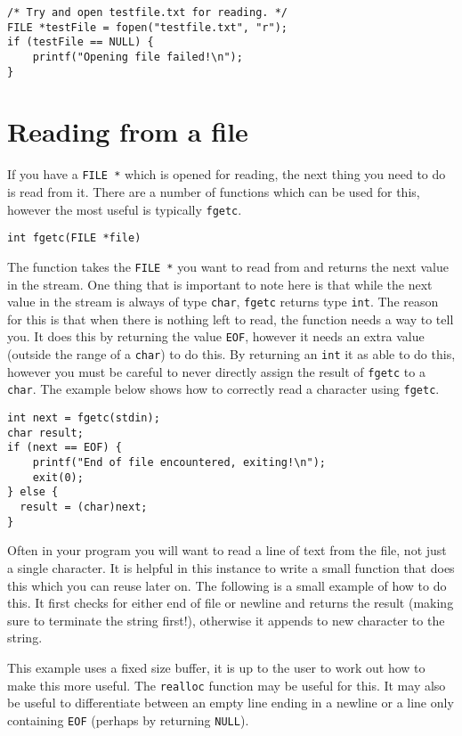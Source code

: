\begin{lstlisting}
/* Try and open testfile.txt for reading. */ 
FILE *testFile = fopen("testfile.txt", "r");
if (testFile == NULL) {
    printf("Opening file failed!\n");
}
\end{lstlisting}

\section{Reading from a file}

If you have a \texttt{FILE *} which is opened for reading, the next thing you need to do is read from it.
There are a number of functions which can be used for this, however the most useful is typically \texttt{fgetc}.

\begin{lstlisting}[numbers=none,frame=none]
int fgetc(FILE *file)
\end{lstlisting}

The function takes the \texttt{FILE *} you want to read from and returns the next value in the stream.
One thing that is important to note here is that while the next value in the stream is always of type \texttt{char}, \texttt{fgetc} returns type \texttt{int}. 
The reason for this is that when there is nothing left to read, the function needs a way to tell you.
It does this by returning the value \texttt{EOF}, however it needs an extra value (outside the range of a \texttt{char}) to do this.
By returning an \texttt{int} it as able to do this, however you must be careful to never directly assign the result of \texttt{fgetc} to a \texttt{char}.
The example below shows how to correctly read a character using \texttt{fgetc}.

\begin{lstlisting}
int next = fgetc(stdin);
char result;
if (next == EOF) {
    printf("End of file encountered, exiting!\n");
    exit(0);
} else {
  result = (char)next;
}
\end{lstlisting}

Often in your program you will want to read a line of text from the file, not just a single character.
It is helpful in this instance to write a small function that does this which you can reuse later on.
The following is a small example of how to do this.
It first checks for either end of file or newline and returns the result (making sure to terminate the string first!), otherwise it appends to new character to the string.

This example uses a fixed size buffer, it is up to the user to work out how to make this more useful.
The \texttt{realloc} function may be useful for this.
It may also be useful to differentiate between an empty line ending in a newline or a line only containing \texttt{EOF} (perhaps by returning \texttt{NULL}).

